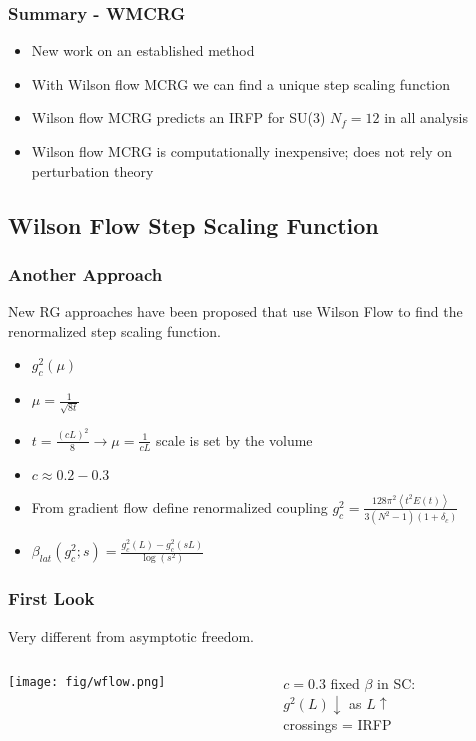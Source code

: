 \begin{frame}
  \frametitle{Summary - WMCRG}
  \begin{itemize}
    \item New work on an established method
    \item With Wilson flow MCRG we can find a unique step scaling function
    \item Wilson flow MCRG predicts an IRFP for SU(3) $N_f=12$ in all analysis
    \item Wilson flow MCRG is computationally inexpensive; does not rely on perturbation theory
  \end{itemize}
\end{frame}

\subsection{Wilson Flow Step Scaling Function}
\addtocounter{framenumber}{-1}

\begin{frame}
  \frametitle{Another Approach}
  New RG approaches have been proposed that use Wilson Flow to find the renormalized step scaling function.
  \begin{itemize}
    \item $g_c^2(\mu)$
    \item $\mu = \frac{1}{\sqrt{8t}}$
    \item $t = \frac{(cL)^2}{8} \rightarrow \mu = \frac{1}{cL}$ scale is set by the volume
    \item $c\approx 0.2-0.3$
    \item From gradient flow define renormalized coupling $g_c^2=\frac{128\pi^2\left<t^2E(t)\right>}{3(N^2-1)(1+\delta_c)}$
    \item $\beta_{lat}(g^2_c; s) = \frac{g^2_c(L) - g^2_c(sL)}{\log(s^2)}$
  \end{itemize}
\end{frame}

\begin{frame}
  \frametitle{First Look}
  Very different from asymptotic freedom.
  \begin{columns}
    \begin{column}{0.65\textwidth}
      \texttt{[image: fig/wflow.png]}
    \end{column}
    \begin{column}{0.35\textwidth}
      \begin{center}
        $c=0.3$
        \vspace{24pt}
        fixed $\beta$ in SC:\\
        $g^2(L) \downarrow$ as $L \uparrow$\\
        \vspace{24pt}
        crossings = IRFP
      \end{center}
    \end{column}
  \end{columns}
\end{frame}

